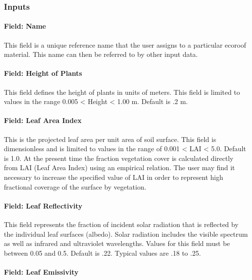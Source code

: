 \subsubsection{Inputs}\label{inputs-32-000}

\paragraph{Field: Name}\label{field-name-26-002}

This field is a unique reference name that the user assigns to a particular ecoroof material. This name can then be referred to by other input data.

\paragraph{Field: Height of Plants}\label{field-height-of-plants}

This field defines the height of plants in units of meters. This field is limited to values in the range 0.005 \textless{} Height \textless{} 1.00 m. Default is .2 m.

\paragraph{Field: Leaf Area Index}\label{field-leaf-area-index}

This is the projected leaf area per unit area of soil surface. This field is dimensionless and is limited to values in the range of 0.001 \textless{} LAI \textless{} 5.0. Default is 1.0. At the present time the fraction vegetation cover is calculated directly from LAI (Leaf Area Index) using an empirical relation. The user may find it necessary to increase the specified value of LAI in order to represent high fractional coverage of the surface by vegetation.

\paragraph{Field: Leaf Reflectivity}\label{field-leaf-reflectivity}

This field represents the fraction of incident solar radiation that is reflected by the individual leaf surfaces (albedo). Solar radiation includes the visible spectrum as well as infrared and ultraviolet wavelengths. Values for this field must be between 0.05 and 0.5. Default is .22. Typical values are .18 to .25.

\paragraph{Field: Leaf Emissivity}\label{field-leaf-emissivity}

